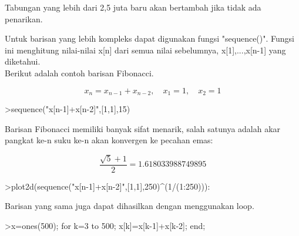 \documentclass[12pt,arial,letterpaper]{book}
\begin{document}
\begin{eulercomment}
\begin{eulercomment}
\begin{eulercomment}
\begin{eulercomment}
\begin{eulercomment}
\begin{eulercomment}
\begin{eulercomment}
\begin{eulercomment}
\begin{eulercomment}
\begin{eulercomment}
\begin{eulercomment}
\begin{eulercomment}
\begin{eulercomment}
\begin{eulercomment}
\begin{eulercomment}
\begin{eulercomment}
\begin{eulercomment}
\begin{eulercomment}
\begin{eulercomment}
\begin{eulercomment}
\begin{eulercomment}
\begin{eulercomment}
\begin{euleroutput}
  [3000,  3002,  3004.01,  3006.03,  3008.05,  3010.08,  3012.12]
\end{euleroutput}
\begin{eulercomment}
Tabungan yang lebih dari 2,5 juta baru akan bertambah jika tidak ada
penarikan.

Untuk barisan yang lebih kompleks dapat digunakan fungsi "sequence()".
Fungsi ini menghitung nilai-nilai x[n] dari semua nilai sebelumnya,
x[1],...,x[n-1] yang diketahui.\\
Berikut adalah contoh barisan Fibonacci.

\end{eulercomment}
\begin{eulerformula}
\[
x_n = x_{n-1}+x_{n-2}, \quad x_1=1, \quad x_2 =1
\]
\end{eulerformula}
\begin{eulerprompt}
>sequence("x[n-1]+x[n-2]",[1,1],15)
\end{eulerprompt}
\begin{euleroutput}
  [1,  1,  2,  3,  5,  8,  13,  21,  34,  55,  89,  144,  233,  377,  610]
\end{euleroutput}
\begin{eulercomment}
Barisan Fibonacci memiliki banyak sifat menarik, salah satunya adalah akar pangkat ke-n suku
ke-n akan konvergen ke pecahan emas:
\end{eulercomment}
\begin{eulerformula}
\[
\frac{\sqrt{5}+1}{2}=1.618033988749895
\]
\end{eulerformula}
\begin{eulerprompt}
>plot2d(sequence("x[n-1]+x[n-2]",[1,1],250)^(1/(1:250))):
\end{eulerprompt}
\begin{eulercomment}
Barisan yang sama juga dapat dihasilkan dengan menggunakan loop.
\end{eulercomment}
\begin{eulerprompt}
>x=ones(500); for k=3 to 500; x[k]=x[k-1]+x[k-2]; end;
\end{eulerprompt}
\begin{eulercomment}

\end{eulercomment}
\end{eulercomment}
\end{eulercomment}
\end{eulercomment}
\end{eulercomment}
\end{eulercomment}
\end{eulercomment}
\end{eulercomment}
\end{eulercomment}
\end{eulercomment}
\end{eulercomment}
\end{eulercomment}
\end{eulercomment}
\end{eulercomment}
\end{eulercomment}
\end{eulercomment}
\end{eulercomment}
\end{eulercomment}
\end{eulercomment}
\end{eulercomment}
\end{eulercomment}
\end{eulercomment}
\end{eulercomment}
\end{document}
